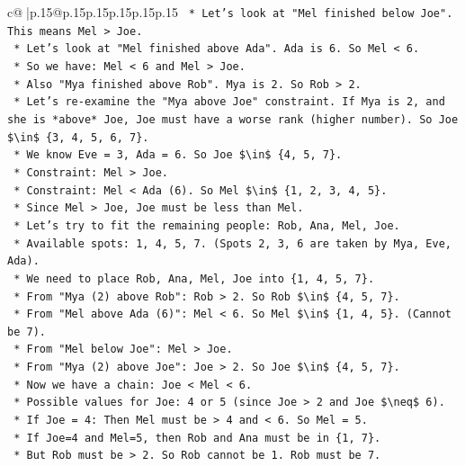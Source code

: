 \documentclass{article}
\begin{document}
{\begin{supertabular}{c@{$\;$}|p{.15\linewidth}@{}p{.15\linewidth}p{.15\linewidth}p{.15\linewidth}p{.15\linewidth}p{.15\linewidth}}
{{{\texttt{        *   Let's look at "Mel finished below Joe". This means Mel > Joe.} \\
\texttt{        *   Let's look at "Mel finished above Ada". Ada is 6. So Mel < 6.} \\
\texttt{        *   So we have: Mel < 6 and Mel > Joe.} \\
\texttt{        *   Also "Mya finished above Rob". Mya is 2. So Rob > 2.} \\
\texttt{    *   Let's re{-}examine the "Mya above Joe" constraint. If Mya is 2, and she is *above* Joe, Joe must have a worse rank (higher number). So Joe \$\textbackslash{}in\$ \{3, 4, 5, 6, 7\}.} \\
\texttt{    *   We know Eve = 3, Ada = 6. So Joe \$\textbackslash{}in\$ \{4, 5, 7\}.} \\
\texttt{    *   Constraint: Mel > Joe.} \\
\texttt{    *   Constraint: Mel < Ada (6). So Mel \$\textbackslash{}in\$ \{1, 2, 3, 4, 5\}.} \\
\texttt{    *   Since Mel > Joe, Joe must be less than Mel.} \\
\texttt{    *   Let's try to fit the remaining people: Rob, Ana, Mel, Joe.} \\
\texttt{    *   Available spots: 1, 4, 5, 7. (Spots 2, 3, 6 are taken by Mya, Eve, Ada).} \\
\texttt{    *   We need to place Rob, Ana, Mel, Joe into \{1, 4, 5, 7\}.} \\
\texttt{    *   From "Mya (2) above Rob": Rob > 2. So Rob \$\textbackslash{}in\$ \{4, 5, 7\}.} \\
\texttt{    *   From "Mel above Ada (6)": Mel < 6. So Mel \$\textbackslash{}in\$ \{1, 4, 5\}. (Cannot be 7).} \\
\texttt{    *   From "Mel below Joe": Mel > Joe.} \\
\texttt{    *   From "Mya (2) above Joe": Joe > 2. So Joe \$\textbackslash{}in\$ \{4, 5, 7\}.} \\
\texttt{    *   Now we have a chain: Joe < Mel < 6.} \\
\texttt{    *   Possible values for Joe: 4 or 5 (since Joe > 2 and Joe \$\textbackslash{}neq\$ 6).} \\
\texttt{    *   If Joe = 4: Then Mel must be > 4 and < 6. So Mel = 5.} \\
\texttt{        *   If Joe=4 and Mel=5, then Rob and Ana must be in \{1, 7\}.} \\
\texttt{        *   But Rob must be > 2. So Rob cannot be 1. Rob must be 7.} \\
}}}
\end{supertabular}}
\end{document}
